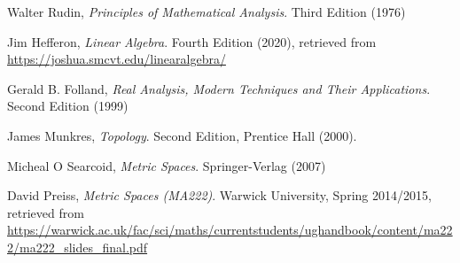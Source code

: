 \begin{thebibliography}{99}
    
    Walter Rudin, \textit{Principles of Mathematical Analysis}. Third Edition (1976) %
    
    Jim Hefferon, \textit{Linear Algebra}. Fourth Edition (2020),  retrieved from \url{https://joshua.smcvt.edu/linearalgebra/}
    
    Gerald B. Folland, \textit{Real Analysis, Modern Techniques and Their Applications}. Second Edition (1999)
    
    James Munkres, \textit{Topology}. Second Edition, Prentice Hall  (2000).
    
    Micheal O Searcoid, \textit{Metric Spaces}. Springer-Verlag (2007)
    
    David Preiss, \textit{Metric Spaces (MA222)}. Warwick University, Spring 2014/2015, retrieved from \url{https://warwick.ac.uk/fac/sci/maths/currentstudents/ughandbook/content/ma222/ma222_slides_final.pdf}
    
\end{thebibliography}